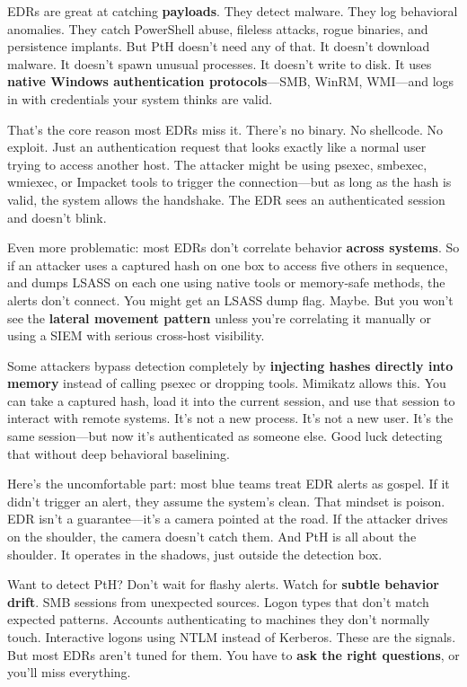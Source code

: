 EDRs are great at catching \textbf{payloads}. They detect malware. They log behavioral anomalies. They catch PowerShell abuse, fileless attacks, rogue binaries, and persistence implants. But PtH doesn’t need any of that. It doesn’t download malware. It doesn’t spawn unusual processes. It doesn’t write to disk. It uses \textbf{native Windows authentication protocols}—SMB, WinRM, WMI—and logs in with credentials your system thinks are valid.

That’s the core reason most EDRs miss it. There’s no binary. No shellcode. No exploit. Just an authentication request that looks exactly like a normal user trying to access another host. The attacker might be using psexec, smbexec, wmiexec, or Impacket tools to trigger the connection—but as long as the hash is valid, the system allows the handshake. The EDR sees an authenticated session and doesn’t blink.

Even more problematic: most EDRs don’t correlate behavior \textbf{across systems}. So if an attacker uses a captured hash on one box to access five others in sequence, and dumps LSASS on each one using native tools or memory-safe methods, the alerts don’t connect. You might get an LSASS dump flag. Maybe. But you won’t see the \textbf{lateral movement pattern} unless you're correlating it manually or using a SIEM with serious cross-host visibility.

Some attackers bypass detection completely by \textbf{injecting hashes directly into memory} instead of calling psexec or dropping tools. Mimikatz allows this. You can take a captured hash, load it into the current session, and use that session to interact with remote systems. It’s not a new process. It’s not a new user. It’s the same session—but now it’s authenticated as someone else. Good luck detecting that without deep behavioral baselining.

Here’s the uncomfortable part: most blue teams treat EDR alerts as gospel. If it didn’t trigger an alert, they assume the system’s clean. That mindset is poison. EDR isn’t a guarantee—it’s a camera pointed at the road. If the attacker drives on the shoulder, the camera doesn’t catch them. And PtH is all about the shoulder. It operates in the shadows, just outside the detection box.

Want to detect PtH? Don’t wait for flashy alerts. Watch for \textbf{subtle behavior drift}. SMB sessions from unexpected sources. Logon types that don’t match expected patterns. Accounts authenticating to machines they don’t normally touch. Interactive logons using NTLM instead of Kerberos. These are the signals. But most EDRs aren’t tuned for them. You have to \textbf{ask the right questions}, or you’ll miss everything.

